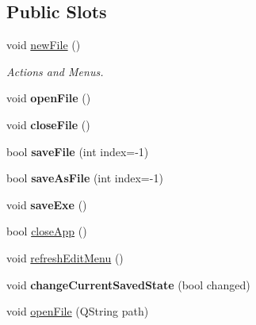\subsection*{Public Slots}
\begin{DoxyCompactItemize}
\item 
void \hyperlink{class_main_window_a69f73b93cc05c89a9ae1be0161105982}{new\+File} ()
\begin{DoxyCompactList}\small\item\em Actions and Menus. \end{DoxyCompactList}\item 
\hypertarget{class_main_window_a288b768c3c21a9171bdc56fe845ece8b}{}void {\bfseries open\+File} ()\label{class_main_window_a288b768c3c21a9171bdc56fe845ece8b}

\item 
\hypertarget{class_main_window_ad11e32151909b28e94538b146958d5a1}{}void {\bfseries close\+File} ()\label{class_main_window_ad11e32151909b28e94538b146958d5a1}

\item 
\hypertarget{class_main_window_aa90a352577dfc8ad0f7e6974f689b596}{}bool {\bfseries save\+File} (int index=-\/1)\label{class_main_window_aa90a352577dfc8ad0f7e6974f689b596}

\item 
\hypertarget{class_main_window_ace2d3f9e772a478c9e10467fc0707128}{}bool {\bfseries save\+As\+File} (int index=-\/1)\label{class_main_window_ace2d3f9e772a478c9e10467fc0707128}

\item 
\hypertarget{class_main_window_abbb16fb2d79a6a8c91695a1aad622383}{}void {\bfseries save\+Exe} ()\label{class_main_window_abbb16fb2d79a6a8c91695a1aad622383}

\item 
bool \hyperlink{class_main_window_a79cd135085ff501e05419fc7153c4e73}{close\+App} ()
\item 
void \hyperlink{class_main_window_a14b2be29dd502629c21f9ec1b0de5de4}{refresh\+Edit\+Menu} ()
\item 
\hypertarget{class_main_window_a117d0f9e30fade99d142818049a5a2b3}{}void {\bfseries change\+Current\+Saved\+State} (bool changed)\label{class_main_window_a117d0f9e30fade99d142818049a5a2b3}

\item 
\hypertarget{class_main_window_ab67a8002596d073eb1460fb06eeaff66}{}void \hyperlink{class_main_window_ab67a8002596d073eb1460fb06eeaff66}{open\+File} (Q\+String path)\label{class_main_window_ab67a8002596d073eb1460fb06eeaff66}


\end{DoxyCompactItemize}
